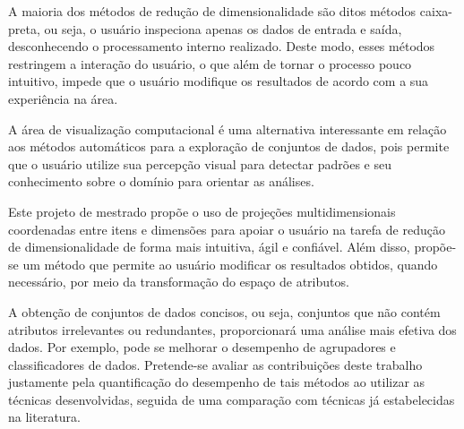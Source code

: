 A maioria dos métodos de redução de dimensionalidade são ditos métodos caixa-preta, ou seja, o usuário inspeciona apenas os dados de entrada e saída, desconhecendo o processamento interno realizado. Deste modo, esses métodos restringem a interação do usuário, o que além de tornar o processo pouco intuitivo, impede que o usuário modifique os resultados de acordo com a sua experiência na área. 

A área de visualização computacional é uma alternativa interessante em relação aos métodos automáticos para a  exploração de conjuntos de dados, pois permite que o usuário utilize sua percepção visual para detectar padrões e seu conhecimento sobre o domínio para  orientar as análises. 



Este projeto de mestrado propõe o uso de projeções multidimensionais coordenadas entre itens e dimensões para apoiar o usuário na tarefa de redução de dimensionalidade de forma mais intuitiva, ágil e confiável. Além disso, propõe-se um método que permite ao usuário modificar os resultados obtidos, quando necessário, por meio da transformação do espaço de atributos.

A obtenção de conjuntos de dados concisos, ou seja, conjuntos que não contém atributos irrelevantes ou redundantes, proporcionará  uma análise mais efetiva dos dados. Por exemplo, pode se melhorar o desempenho de agrupadores e classificadores de dados. Pretende-se avaliar as contribuições deste trabalho justamente pela quantificação do desempenho de tais métodos ao utilizar as técnicas desenvolvidas, seguida de uma comparação com técnicas já estabelecidas na literatura.


